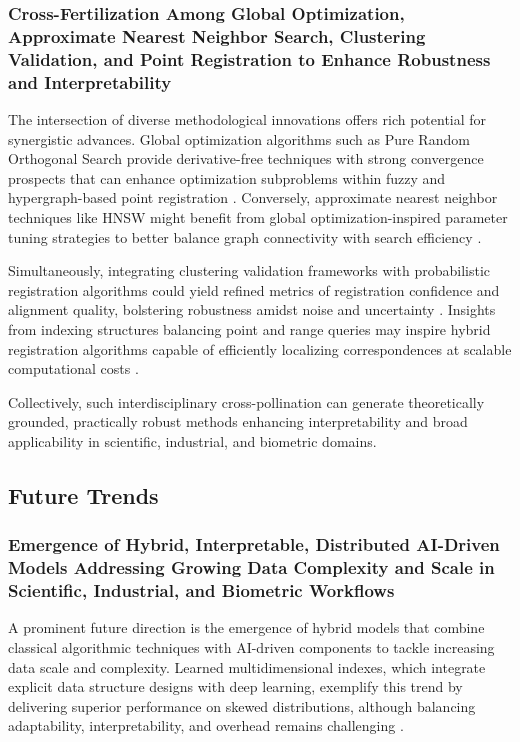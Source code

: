 \documentclass[sigconf]{acmart}
\begin{document}
\subsubsection{Cross-Fertilization Among Global Optimization, Approximate Nearest Neighbor Search, Clustering Validation, and Point Registration to Enhance Robustness and Interpretability}

The intersection of diverse methodological innovations offers rich potential for synergistic advances. Global optimization algorithms such as Pure Random Orthogonal Search provide derivative-free techniques with strong convergence prospects that can enhance optimization subproblems within fuzzy and hypergraph-based point registration \cite{ref8,ref6}. Conversely, approximate nearest neighbor techniques like HNSW might benefit from global optimization-inspired parameter tuning strategies to better balance graph connectivity with search efficiency \cite{ref4}.

Simultaneously, integrating clustering validation frameworks with probabilistic registration algorithms could yield refined metrics of registration confidence and alignment quality, bolstering robustness amidst noise and uncertainty \cite{ref24,ref5}. Insights from indexing structures balancing point and range queries may inspire hybrid registration algorithms capable of efficiently localizing correspondences at scalable computational costs \cite{ref35}.

Collectively, such interdisciplinary cross-pollination can generate theoretically grounded, practically robust methods enhancing interpretability and broad applicability in scientific, industrial, and biometric domains.

\subsection{Future Trends}

\subsubsection{Emergence of Hybrid, Interpretable, Distributed AI-Driven Models Addressing Growing Data Complexity and Scale in Scientific, Industrial, and Biometric Workflows}

A prominent future direction is the emergence of hybrid models that combine classical algorithmic techniques with AI-driven components to tackle increasing data scale and complexity. Learned multidimensional indexes, which integrate explicit data structure designs with deep learning, exemplify this trend by delivering superior performance on skewed distributions, although balancing adaptability, interpretability, and overhead remains challenging \cite{ref33}.
\end{document}
